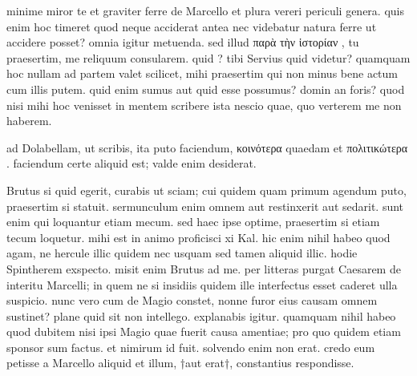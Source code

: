


 minime miror te et graviter ferre de Marcello et plura vereri periculi genera. quis enim hoc timeret quod neque acciderat antea nec videbatur natura ferre ut accidere posset? omnia igitur metuenda. sed illud παρὰ τὴν ἱστορίαν , tu praesertim, me reliquum consularem. quid ? tibi Servius quid videtur? quamquam hoc nullam ad partem valet scilicet, mihi praesertim qui non minus bene actum cum illis putem. quid enim sumus aut quid esse possumus? domin an foris? quod nisi mihi hoc venisset in mentem scribere ista nescio quae, quo verterem me non haberem.

 ad Dolabellam, ut scribis, ita puto faciendum, κοινότερα quaedam et πολιτικώτερα . faciendum certe aliquid est; valde enim desiderat.

 Brutus si quid egerit, curabis ut sciam; cui quidem quam primum agendum puto, praesertim si statuit. sermunculum enim omnem aut restinxerit aut sedarit. sunt enim qui loquantur etiam mecum. sed haec ipse optime, praesertim si etiam tecum loquetur. mihi est in animo proficisci xi Kal. hic enim nihil habeo quod agam, ne hercule illic quidem nec usquam sed tamen aliquid illic. hodie Spintherem exspecto. misit enim Brutus ad me. per litteras purgat Caesarem de interitu Marcelli; in quem ne si insidiis quidem ille interfectus esset caderet ulla suspicio. nunc vero cum de Magio constet, nonne furor eius causam omnem sustinet? plane quid sit non intellego. explanabis igitur. quamquam nihil habeo quod dubitem nisi ipsi Magio quae fuerit causa amentiae; pro quo quidem etiam sponsor sum factus. et nimirum id fuit. solvendo enim non erat. credo eum petisse a Marcello aliquid et illum, †aut erat†, constantius respondisse.
